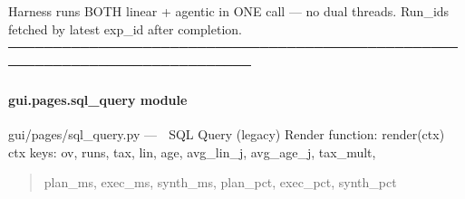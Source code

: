 \documentclass[letterpaper,10pt,english]{sphinxmanual}
\begin{document}
\sphinxAtStartPar
Harness runs BOTH linear + agentic in ONE call — no dual threads.
Run\_ids fetched by latest exp\_id after completion.
─────────────────────────────────────────────────────────────────────────────

\begin{fulllineitems}
\label{\detokenize{gui.pages.silicon_journey:gui.pages.silicon_journey.render}}
\pysigstartsignatures
\pysiglinewithargsret
{}
{}
{}
\pysigstopsignatures
\end{fulllineitems}


\sphinxstepscope


\paragraph{gui.pages.sql\_query module}
\label{\detokenize{gui.pages.sql_query:module-gui.pages.sql_query}}\label{\detokenize{gui.pages.sql_query:gui-pages-sql-query-module}}\label{\detokenize{gui.pages.sql_query::doc}}
\sphinxAtStartPar
gui/pages/sql\_query.py  —  💬  SQL Query (legacy)
Render function: render(ctx)
ctx keys: ov, runs, tax, lin, age, avg\_lin\_j, avg\_age\_j, tax\_mult,
\begin{quote}

\sphinxAtStartPar
plan\_ms, exec\_ms, synth\_ms, plan\_pct, exec\_pct, synth\_pct
\end{quote}

\begin{fulllineitems}
\label{\detokenize{gui.pages.sql_query:gui.pages.sql_query.render}}
\pysigstartsignatures
\pysiglinewithargsret
{}
{}
{}
\pysigstopsignatures
\end{fulllineitems}


\sphinxstepscope
\end{document}

